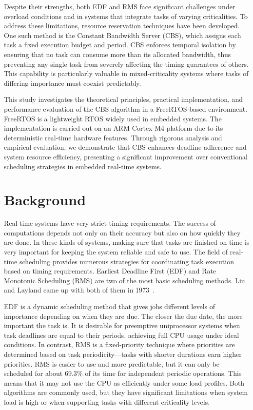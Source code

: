 \documentclass[conference]{IEEEtran}
\begin{document}
Despite their strengths, both EDF and RMS face significant challenges under overload conditions and in systems that integrate tasks of varying criticalities. To address these limitations, resource reservation techniques have been developed. One such method is the Constant Bandwidth Server (CBS), which assigns each task a fixed execution budget and period. CBS enforces temporal isolation by ensuring that no task can consume more than its allocated bandwidth, thus preventing any single task from severely affecting the timing guarantees of others. This capability is particularly valuable in mixed-criticality systems where tasks of differing importance must coexist predictably.

This study investigates the theoretical principles, practical implementation, and performance evaluation of the CBS algorithm in a FreeRTOS-based environment. FreeRTOS is a lightweight RTOS widely used in embedded systems. The implementation is carried out on an ARM Cortex-M4 platform due to its deterministic real-time hardware features. Through rigorous analysis and empirical evaluation, we demonstrate that CBS enhances deadline adherence and system resource efficiency, presenting a significant improvement over conventional scheduling strategies in embedded real-time systems.

\section{Background}

Real-time systems have very strict timing requirements. The success of computations depends not only on their accuracy but also on how quickly they are done. In these kinds of systems, making sure that tasks are finished on time is very important for keeping the system reliable and safe to use. The field of real-time scheduling provides numerous strategies for coordinating task execution based on timing requirements. Earliest Deadline First (EDF) and Rate Monotonic Scheduling (RMS) are two of the most basic scheduling methods. Liu and Layland came up with both of them in 1973~\cite{liu1973scheduling}.

EDF is a dynamic scheduling method that gives jobs different levels of importance depending on when they are due. The closer the due date, the more important the task is. It is desirable for preemptive uniprocessor systems when task deadlines are equal to their periods, achieving full CPU usage under ideal conditions. In contrast, RMS is a fixed-priority technique where priorities are determined based on task periodicity—tasks with shorter durations earn higher priorities. RMS is easier to use and more predictable, but it can only be scheduled for about 69.3\% of its time for independent periodic operations. This means that it may not use the CPU as efficiently under some load profiles. Both algorithms are commonly used, but they have significant limitations when system load is high or when supporting tasks with different criticality levels.
\end{document}
